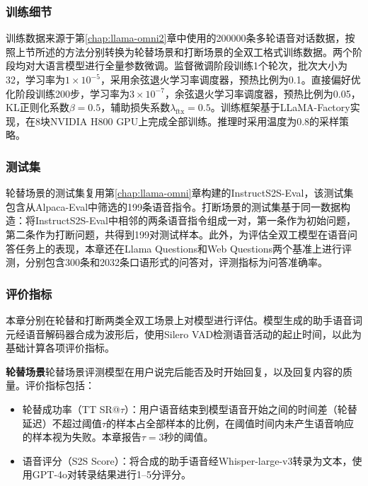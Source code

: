 \subsubsection{训练细节}

训练数据来源于第\ref{chap:llama-omni2}章中使用的200000条多轮语音对话数据，按照上节所述的方法分别转换为轮替场景和打断场景的全双工格式训练数据。两个阶段均对大语言模型进行全量参数微调。监督微调阶段训练1个轮次，批次大小为32，学习率为$1\times 10^{-5}$，采用余弦退火学习率调度器，预热比例为0.1。直接偏好优化阶段训练200步，学习率为$3\times 10^{-7}$，余弦退火学习率调度器，预热比例为0.05，KL正则化系数$\beta = 0.5$，辅助损失系数$\lambda_{\text{ftx}} = 0.5$。训练框架基于LLaMA-Factory\citep{zheng2024llamafactory}实现，在8块NVIDIA H800 GPU上完成全部训练。推理时采用温度为0.8的采样策略。

\subsubsection{测试集}

轮替场景的测试集复用第\ref{chap:llama-omni}章构建的InstructS2S-Eval，该测试集包含从Alpaca-Eval\citep{alpacaeval}中筛选的199条语音指令。打断场景的测试集基于同一数据构造：将InstructS2S-Eval中相邻的两条语音指令组成一对，第一条作为初始问题，第二条作为打断问题，共得到199对测试样本。此外，为评估全双工模型在语音问答任务上的表现，本章还在Llama Questions\citep{nachmani2024spoken}和Web Questions\citep{berant-etal-2013-semantic}两个基准上进行评测，分别包含300条和2032条口语形式的问答对，评测指标为问答准确率。

\subsubsection{评价指标}

本章分别在轮替和打断两类全双工场景上对模型进行评估。模型生成的助手语音词元经语音解码器合成为波形后，使用Silero VAD\citep{silerovad}检测语音活动的起止时间，以此为基础计算各项评价指标。

\textbf{轮替场景}\quad 轮替场景评测模型在用户说完后能否及时开始回复，以及回复内容的质量。评价指标包括：
\begin{itemize}
    \item 轮替成功率（TT SR@$\tau$）：用户语音结束到模型语音开始之间的时间差（轮替延迟）不超过阈值$\tau$的样本占全部样本的比例，在阈值时间内未产生语音响应的样本视为失败。本章报告$\tau = 3$秒的阈值。
    \item 语音评分（S2S Score）：将合成的助手语音经Whisper-large-v3\citep{whisper}转录为文本，使用GPT-4o\citep{gpt4o}对转录结果进行1--5分评分。
\end{itemize}

